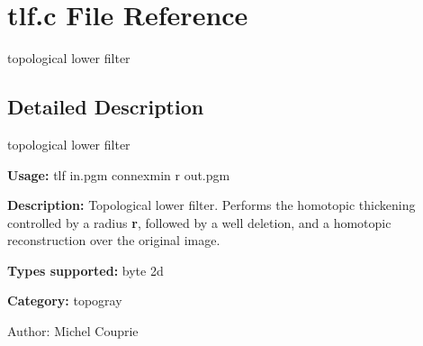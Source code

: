 \section{tlf.c File Reference}
\label{tlf_8c}
topological lower filter 



\subsection{Detailed Description}
topological lower filter 

{\bf Usage:} tlf in.pgm connexmin r out.pgm

{\bf Description:} Topological lower filter. Performs the homotopic thickening controlled by a radius {\bf r}, followed by a well deletion, and a homotopic reconstruction over the original image.

{\bf Types supported:} byte 2d

{\bf Category:} topogray

\begin{Desc}
\item[Author:]Michel Couprie \end{Desc}

